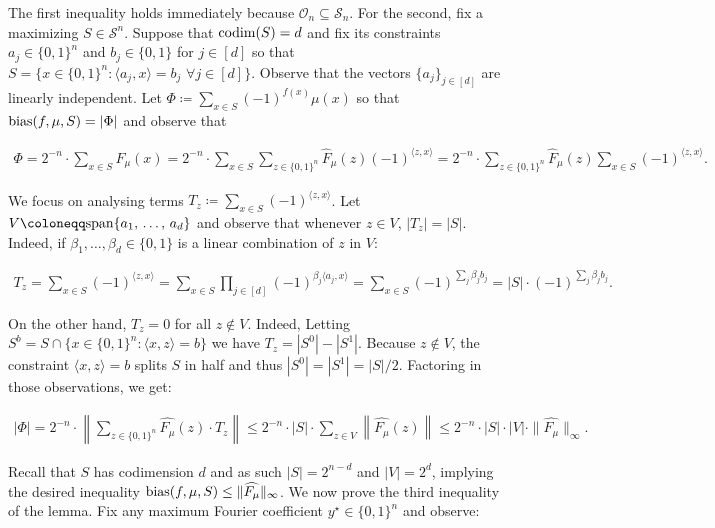 \documentclass[10pt,a4paper]{article}
\begin{document}
The first inequality holds immediately because $\mathcal{O}_{n}\subseteq\mathcal{S}_{n}$. For the second, fix a maximizing $S\in\mathcal{S}^{n}$. Suppose that $\textup{codim}(S)=d$ and fix its constraints $a_{j}\in\{0,1\}^{n}$ and $b_{j}\in\{0,1\}$ for $j\in[d]$ so that $S=\{x\in\{0,1\}^{n}:\langle a_{j},x\rangle=b_{j}\,\,\forall j\in[d]\}$. Observe that the vectors $\{a_{j}\}_{j\in[d]}$ are linearly independent. Let $\Phi\coloneqq\sum\nolimits_{x\in S}(-1)^{f(x)}\mu(x)$ so that ${\textup{bias}}(f,\mu,S)=|\Phi|$ and observe that\par


\[\begin{gathered}
\Phi=2^{-n}\cdot\sum_{x\in S}F_{\mu}(x)=2^{-n}\cdot\sum_{x\in S}\sum_{z\in\{0,1\}^{n}}\widehat{F}_{\mu}(z)(-1)^{\langle z,x\rangle}=2^{-n}\cdot\sum_{z\in\{0,1\}^{n}}\widehat{F}_{\mu}(z)\sum_{x\in S}(-1)^{\langle z,x\rangle}.
\end{gathered}\]


We focus on analysing terms $T_{z}\coloneqq\sum_{x\in S}(-1)^{\langle z,x\rangle}$. Let $V\coloneqq\textup{span}\{a_{1},\,\dots,\,a_{d}\}$ and observe that whenever $z\in V$, $|T_{z}|=|S|$. Indeed, if $\beta_{1},\dots,\beta_{d}\in\{0,1\}$ is a linear combination of $z$ in $V$:\par


\[\begin{gathered}
T_{z}=\sum_{x\in S}(-1)^{\langle z,x\rangle}=\sum_{x\in S}\prod_{j\in[d]}(-1)^{\beta_{j}\langle a_{j},x\rangle}=\sum_{x\in S}(-1)^{\sum_{j}\beta_{j}b_{j}}=|S|\cdot(-1)^{\sum_{j}\beta_{j}b_{j}}.
\end{gathered}\]


On the other hand, $T_{z}=0$ for all $z\notin V$. Indeed, Letting $S^{b}=S\cap\{x\in\{0,1\}^{n}:\langle x,z\rangle=b\}$ we have $T_{z}=|S^{0}|-|S^{1}|$. Because $z\notin V$, the constraint $\langle x,z\rangle=b$ splits $S$ in half and thus $|S^{0}|=|S^{1}|=|S|/2$. Factoring in those observations, we get:\par


\[\begin{gathered}
|\Phi|=2^{-n}\cdot\left\|\sum_{z\in\{0,1\}^{n}}\widehat{F_{\mu}}(z)\cdot T_{z}\right\|\leq 2^{-n}\cdot|S|\cdot\sum_{z\in V}\left\|\widehat{F_{\mu}}(z)\right\|\leq 2^{-n}\cdot|S|\cdot|V|\cdot\|\widehat{F_{\mu}}\|_{\infty}.
\end{gathered}\]


Recall that $S$ has codimension $d$ and as such $|S|=2^{n-d}$ and $|V|=2^{d}$, implying the desired inequality ${\textup{bias}}(f,\mu,S)\leq\|\widehat{F_{\mu}}\|_{\infty}$. We now prove the third inequality of the lemma. Fix any maximum Fourier coefficient $y^{\star}\in\{0,1\}^{n}$ and observe:\par
\end{document}
